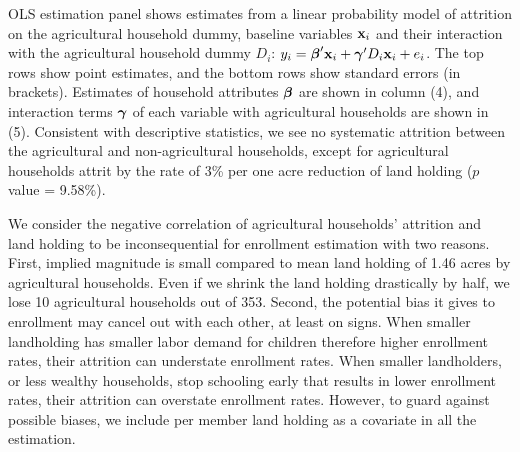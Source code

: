 \documentclass[12pt,letterpaper]{article}
\newcommand{\bfbeta}{\ensuremath{\mbox{\boldmath $\beta$}}}
\newcommand{\bfgamma}{\ensuremath{\mbox{\boldmath $\gamma$}}}
\newcommand{\bfx}{\ensuremath{\mbox{\bf x}}}
\newcommand{\0}{\ensuremath{\mbox{\boldmath $0$}}}
\begin{document}
\textsf{OLS estimation} panel shows estimates from a linear probability model of attrition on the agricultural household dummy, baseline variables $\bfx_{i}$ and their interaction with the agricultural household dummy $D_{i}$: $y_{i}=\bfbeta'\bfx_{i}+\bfgamma'D_{i}\bfx_{i}+e_{i}$. The top rows show point estimates, and the bottom rows show standard errors (in brackets). Estimates of household attributes $\bfbeta$ are shown in column (4), and interaction terms $\bfgamma$ of each variable with agricultural households are shown in (5). Consistent with descriptive statistics, we see no systematic attrition between the agricultural and non-agricultural households, except for agricultural households attrit by the rate of 3\% per one acre reduction of land holding ($p$ value = 9.58\%). 

We consider the negative correlation of agricultural households' attrition and land holding to be inconsequential for enrollment estimation with two reasons. First, implied magnitude is small compared to mean land holding of 1.46 acres by agricultural households. Even if we shrink the land holding drastically by half, we lose 10 agricultural households out of 353. Second, the potential bias it gives to enrollment may cancel out with each other, at least on signs. When smaller landholding has smaller labor demand for children therefore higher enrollment rates, their attrition can understate enrollment rates. When smaller landholders, or less wealthy households, stop schooling early that results in lower enrollment rates, their attrition can overstate enrollment rates. However, to guard against possible biases, we include per member land holding as a covariate in all the estimation.  
\end{document}

